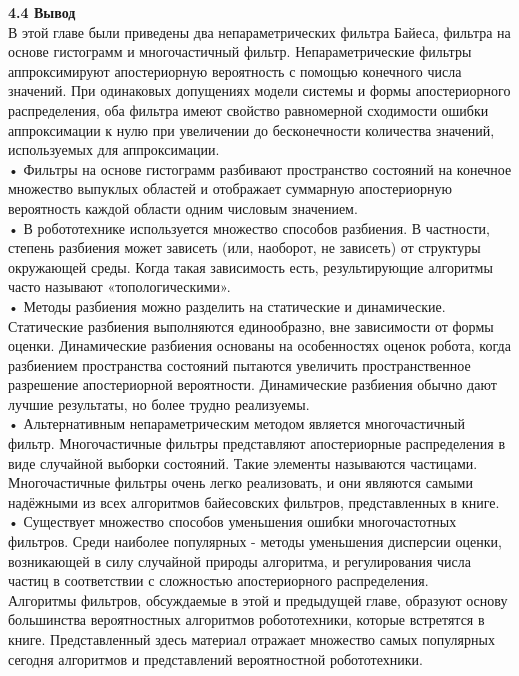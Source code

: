 \documentclass[10pt,a4paper]{article}
\begin{document}
\textbf{4.4 Вывод}\\

В этой главе были приведены два непараметрических фильтра Байеса, фильтра на основе гистограмм и многочастичный фильтр. Непараметрические фильтры аппроксимируют апостериорную вероятность с помощью конечного числа значений. При одинаковых допущениях модели системы и формы апостериорного распределения, оба фильтра имеют свойство равномерной сходимости ошибки аппроксимации к нулю при увеличении до бесконечности количества значений, используемых для аппроксимации.\\

• Фильтры на основе гистограмм разбивают пространство состояний на конечное множество выпуклых областей и отображает суммарную апостериорную вероятность каждой области одним числовым значением.\\

• В робототехнике используется множество способов разбиения. В частности, степень разбиения может зависеть (или, наоборот, не зависеть) от структуры окружающей среды. Когда такая зависимость есть, результирующие алгоритмы часто называют «топологическими».\\

• Методы разбиения можно разделить на статические и динамические. Статические разбиения выполняются единообразно, вне зависимости от формы оценки. Динамические разбиения основаны на особенностях оценок робота, когда разбиением пространства состояний пытаются увеличить пространственное разрешение апостериорной вероятности. Динамические разбиения обычно дают лучшие результаты, но более трудно реализуемы.\\
 
• Альтернативным непараметрическим методом является многочастичный фильтр. Многочастичные фильтры представляют апостериорные распределения в виде случайной выборки состояний. Такие элементы называются частицами. Многочастичные фильтры очень легко реализовать, и они являются самыми надёжными из всех алгоритмов байесовских фильтров, представленных в книге. \\

• Существует множество способов уменьшения ошибки многочастотных фильтров. Среди наиболее популярных -  методы уменьшения дисперсии оценки, возникающей в силу случайной природы алгоритма, и регулирования числа частиц в соответствии с сложностью апостериорного распределения. \\ 
  
Алгоритмы фильтров, обсуждаемые в этой и предыдущей главе, образуют основу большинства вероятностных алгоритмов робототехники, которые встретятся в книге.  Представленный здесь материал отражает множество самых популярных сегодня алгоритмов и представлений вероятностной робототехники. \\
\end{document}
